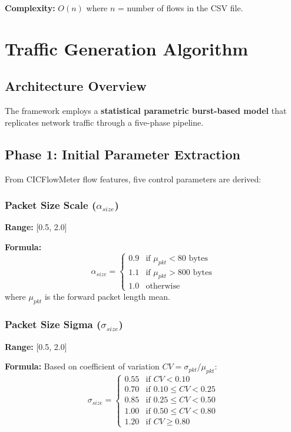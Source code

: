 \documentclass[11pt,a4paper]{article}
\begin{document}
\textbf{Complexity:} $O(n)$ where $n$ = number of flows in the CSV file.

\section{Traffic Generation Algorithm}

\subsection{Architecture Overview}

The framework employs a \textbf{statistical parametric burst-based model} that replicates network traffic through a five-phase pipeline.

\subsection{Phase 1: Initial Parameter Extraction}

From CICFlowMeter flow features, five control parameters are derived:

\subsubsection{Packet Size Scale ($\alpha_{size}$)}

\textbf{Range:} [0.5, 2.0]

\textbf{Formula:}
\begin{equation}
\alpha_{size} = \begin{cases}
0.9 & \text{if } \mu_{pkt} < 80 \text{ bytes} \\
1.1 & \text{if } \mu_{pkt} > 800 \text{ bytes} \\
1.0 & \text{otherwise}
\end{cases}
\end{equation}
where $\mu_{pkt}$ is the forward packet length mean.

\subsubsection{Packet Size Sigma ($\sigma_{size}$)}

\textbf{Range:} [0.5, 2.0]

\textbf{Formula:} Based on coefficient of variation $CV = \sigma_{pkt}/\mu_{pkt}$:
\begin{equation}
\sigma_{size} = \begin{cases}
0.55 & \text{if } CV < 0.10 \\
0.70 & \text{if } 0.10 \leq CV < 0.25 \\
0.85 & \text{if } 0.25 \leq CV < 0.50 \\
1.00 & \text{if } 0.50 \leq CV < 0.80 \\
1.20 & \text{if } CV \geq 0.80
\end{cases}
\end{equation}
\end{document}
